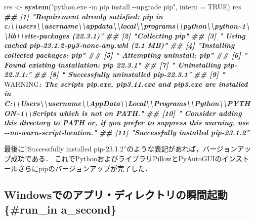 \documentclass[
]{article}
\newenvironment{Shaded}{\begin{snugshade}}{\end{snugshade}}
\newcommand{\AlertTok}[1]{\textcolor[rgb]{0.94,0.16,0.16}{#1}}
\newcommand{\AttributeTok}[1]{\textcolor[rgb]{0.13,0.29,0.53}{#1}}
\newcommand{\ConstantTok}[1]{\textcolor[rgb]{0.56,0.35,0.01}{#1}}
\newcommand{\DocumentationTok}[1]{\textcolor[rgb]{0.56,0.35,0.01}{\textbf{\textit{#1}}}}
\newcommand{\FunctionTok}[1]{\textcolor[rgb]{0.13,0.29,0.53}{\textbf{#1}}}
\newcommand{\NormalTok}[1]{#1}
\newcommand{\OtherTok}[1]{\textcolor[rgb]{0.56,0.35,0.01}{#1}}
\newcommand{\StringTok}[1]{\textcolor[rgb]{0.31,0.60,0.02}{#1}}
\begin{document}
\begin{Shaded}
\begin{Highlighting}[]
\NormalTok{res }\OtherTok{\textless{}{-}} \FunctionTok{system}\NormalTok{(}\StringTok{"python.exe {-}m pip install {-}{-}upgrade pip"}\NormalTok{, }\AttributeTok{intern =} \ConstantTok{TRUE}\NormalTok{)}
\NormalTok{res}
\DocumentationTok{\#\#  [1] "Requirement already satisfied: pip in c:\textbackslash{}\textbackslash{}users\textbackslash{}\textbackslash{}username\textbackslash{}\textbackslash{}appdata\textbackslash{}\textbackslash{}local\textbackslash{}\textbackslash{}programs\textbackslash{}\textbackslash{}python\textbackslash{}\textbackslash{}python\textasciitilde{}1\textbackslash{}\textbackslash{}lib\textbackslash{}\textbackslash{}site{-}packages (22.3.1)"}
\DocumentationTok{\#\#  [2] "Collecting pip"}
\DocumentationTok{\#\#  [3] "  Using cached pip{-}23.1.2{-}py3{-}none{-}any.whl (2.1 MB)"}
\DocumentationTok{\#\#  [4] "Installing collected packages: pip"}
\DocumentationTok{\#\#  [5] "  Attempting uninstall: pip"}
\DocumentationTok{\#\#  [6] "    Found existing installation: pip 22.3.1"}
\DocumentationTok{\#\#  [7] "    Uninstalling pip{-}22.3.1:"}
\DocumentationTok{\#\#  [8] "      Successfully uninstalled pip{-}22.3.1"}
\DocumentationTok{\#\#  [9] "  }\AlertTok{WARNING}\DocumentationTok{: The scripts pip.exe, pip3.11.exe and pip3.exe are installed in \textquotesingle{}C:\textbackslash{}\textbackslash{}Users\textbackslash{}\textbackslash{}username\textbackslash{}\textbackslash{}AppData\textbackslash{}\textbackslash{}Local\textbackslash{}\textbackslash{}Programs\textbackslash{}\textbackslash{}Python\textbackslash{}\textbackslash{}PYTHON\textasciitilde{}1\textbackslash{}\textbackslash{}Scripts\textquotesingle{} which is not on PATH."}
\DocumentationTok{\#\# [10] "  Consider adding this directory to PATH or, if you prefer to suppress this warning, use {-}{-}no{-}warn{-}script{-}location."}
\DocumentationTok{\#\# [11] "Successfully installed pip{-}23.1.2"}
\end{Highlighting}
\end{Shaded}

最後に''Successfully installed pip-23.1.2''のような表記があれば，バージョンアップ成功である．
これでPythonおよびライブラリPillowとPyAutoGUIのインストールさらにpipのバージョンアップが完了した．

\hypertarget{windowsux3067ux306eux30a2ux30d7ux30eaux30c7ux30a3ux30ecux30afux30c8ux30eaux306eux77acux9593ux8d77ux52d5-run_in-a_second}{%
\subsection{Windowsでのアプリ・ディレクトリの瞬間起動 \{\#run\_in a\_second\}}\label{windowsux3067ux306eux30a2ux30d7ux30eaux30c7ux30a3ux30ecux30afux30c8ux30eaux306eux77acux9593ux8d77ux52d5-run_in-a_second}}
\end{document}
